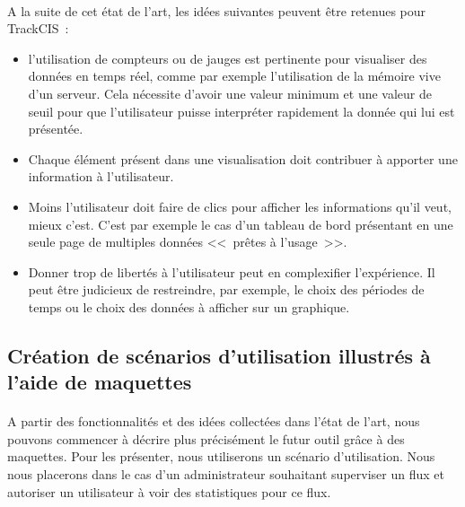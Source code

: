 			\paragraph{}
			A la suite de cet état de l'art, les idées suivantes peuvent être retenues
			pour TrackCIS~:
			\begin{itemize}
			  \item l'utilisation de compteurs ou de jauges est pertinente pour
			  visualiser des données en temps réel, comme par exemple l'utilisation de
			  la mémoire vive d'un serveur. Cela nécessite d'avoir une valeur minimum et
			  une valeur de seuil pour que l'utilisateur puisse interpréter rapidement la
			  donnée qui lui est présentée.
			  \item Chaque élément présent dans une visualisation doit contribuer à
			  apporter une information à l'utilisateur.
			  \item Moins l'utilisateur doit faire de clics pour afficher les
			  informations qu'il veut, mieux c'est. C'est par exemple le cas d'un tableau
			  de bord présentant en une seule page de multiples données <<~prêtes à
			  l'usage~>>.
			  \item Donner trop de libertés à l'utilisateur peut en complexifier
			  l'expérience. Il peut être judicieux de restreindre, par exemple, le choix
			  des périodes de temps ou le choix des données à afficher sur un graphique.
			\end{itemize}
			
		\subsection{Création de scénarios d'utilisation illustrés à l'aide de
		maquettes}
			\paragraph{}
			A partir des fonctionnalités et des idées collectées dans l'état de l'art,
			nous pouvons commencer à décrire plus précisément le futur outil grâce à des
			maquettes. Pour les présenter, nous utiliserons un scénario d'utilisation.
			Nous nous placerons dans le cas d'un administrateur souhaitant superviser un
			flux et autoriser un utilisateur à voir des statistiques pour ce flux.
			
